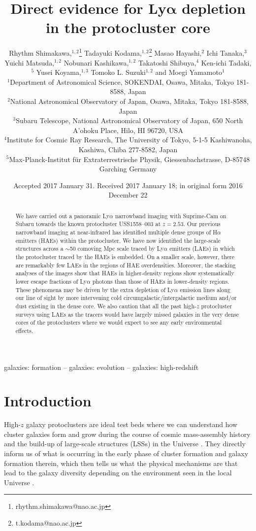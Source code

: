 \documentclass[letters,usenatbib]{mnras}
\title[Ly$\alpha$ depletion in the protocluster core]{Direct evidence for Ly$\boldsymbol\alpha$ depletion in the protocluster core}
\author[R. Shimakawa et al.]{
Rhythm Shimakawa,$^{1,2}$\thanks{rhythm.shimakawa@nao.ac.jp} 
Tadayuki Kodama,$^{1,2}$\thanks{t.kodama@nao.ac.jp}
Masao Hayashi,$^{2}$
Ichi Tanaka,$^{3}$
\newauthor
Yuichi Matsuda,$^{1,2}$
Nobunari Kashikawa,$^{1,2}$
Takatoshi Shibuya,$^{4}$
Ken-ichi Tadaki,$^{5}$
\newauthor
Yusei Koyama,$^{1,3}$
Tomoko L. Suzuki$^{1,2}$
and Moegi Yamamoto$^{1}$
\\
$^{1}$Department of Astronomical Science, SOKENDAI, Osawa, Mitaka, Tokyo 181-8588, Japan\\
$^{2}$National Astronomical Observatory of Japan, Osawa, Mitaka, Tokyo 181-8588, Japan\\
$^{3}$Subaru Telescope, National Astronomical Observatory of Japan, 650 North A'ohoku Place, Hilo, HI 96720, USA\\
$^{4}$Institute for Cosmic Ray Research, The University of Tokyo, 5-1-5 Kashiwanoha, Kashiwa, Chiba 277-8582, Japan\\
$^{5}$Max-Planck-Institut f\"{u}r Extraterrestrische Physik, Giessenbachstrasse, D-85748 Garching Germany
}
\date{Accepted 2017 January 31. Received 2017 January 18; in original form 2016 December 22}
\begin{document}
\label{firstpage}
\pagerange{\pageref{firstpage}--\pageref{lastpage}}
\maketitle

\begin{abstract}
We have carried out a panoramic Ly$\alpha$ narrowband imaging with Suprime-Cam on 
Subaru towards the known protocluster USS1558--003 at $z=2.53$. Our previous 
narrowband imaging at near-infrared has identified multiple dense groups of 
H$\alpha$ emitters (HAEs) within the protocluster. We have now identified the 
large-scale structures across a $\sim$50 comoving Mpc scale traced by Ly$\alpha$ 
emitters (LAEs) in which the protocluster traced by the HAEs is embedded. On a 
smaller scale, however, there are remarkably few LAEs in the regions of HAE 
overdensities. Moreover, the stacking analyses of the images show that HAEs in 
higher-density regions show systematically lower escape fractions of Ly$\alpha$ 
photons than those of HAEs in lower-density regions. These phenomena may be driven 
by the extra depletion of Ly$\alpha$ emission lines along our line of sight by 
more intervening cold circumgalactic/intergalactic medium and/or dust existing in 
the dense core. We also caution that all the past high-$z$ protocluster surveys 
using LAEs as the tracers would have largely missed galaxies in the very dense 
cores of the protoclusters where we would expect to see any early environmental 
effects.

\end{abstract}

\begin{keywords}
galaxies: formation -- galaxies: evolution -- galaxies: high-redshift
\end{keywords}



\section{Introduction}

High-$z$ galaxy protoclusters \citep{Sunyaev:1972} are ideal test beds where we 
can understand how cluster galaxies form and grow during the course of cosmic 
mass-assembly history and the build-up of large-scale structures (LSSs) in the 
Universe \citep{White:1991,Cole:2000}. They directly inform us of what is 
occurring in the early phase of cluster formation and galaxy formation therein, 
which then tells us what the physical mechanisms are that lead to the galaxy 
diversity depending on the environment seen in the local Universe 
\citep{Dressler:1980,Cappellari:2011}. 
\end{document}
